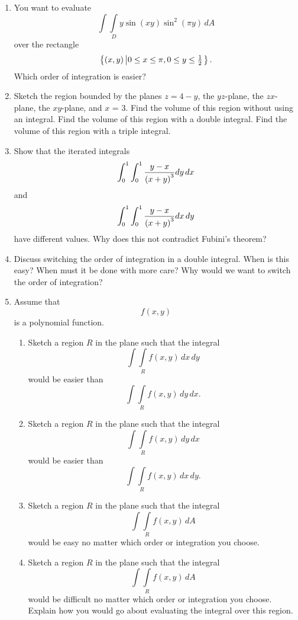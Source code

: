 \begin{enumerate}
\item  You want to evaluate $$ \int\!\!\!\int\limits_D {y\sin (xy)\sin ^2 (\pi y)} \,dA $$  over the rectangle $$ \left\{ {(x,y)\left| {0 \le x \le \pi ,0 \le y \le {\textstyle{1 \over 2}}} \right.} \right\} .$$  Which order of integration is easier?  

\item  Sketch the region bounded by the planes $z = 4 - y$, the $yz$-plane, the $zx$-plane, the $xy$-plane, and $x$ = 3.  Find the volume of this region without using an integral.  Find the volume of this region with a double integral.  Find the volume of this region with a triple integral.    

\item  Show that the iterated integrals $$ \int_0^1 {\int_0^1 {{{y - x} \over {\left( {x + y} \right)^3 }}dy\,dx} }  $$  and $$ \int_0^1 {\int_0^1 {{{y - x} \over {\left( {x + y} \right)^3 }}dx\,dy} }  $$  have different values.   Why does this not contradict Fubini's theorem?  \cite{SBS}  

\item  Discuss switching the order of integration in a double integral.  When is this easy?  When must it be done with more care?  Why would we want to switch the order of integration?  

\item  Assume that $$ f(x,y) $$  is a polynomial function.
\begin{enumerate} 

\item  Sketch a region $R$ in the plane such that the integral $$ \int\!\!\!\int\limits_R {f(x,y)\,dx\,dy}  $$  would be easier than $$ \int\!\!\!\int\limits_R {f(x,y)\,dy\,dx}  .$$


\item  Sketch a region $R$ in the plane such that the integral $$ \int\!\!\!\int\limits_R {f(x,y)\,dy\,dx}  $$  would be easier than $$ \int\!\!\!\int\limits_R {f(x,y)\,dx\,dy}  .$$  


\item  Sketch a region $R$ in the plane such that the integral $$ \int\!\!\!\int\limits_R {f(x,y)\,dA}  $$  would be easy no matter which order or integration you choose.  


\item  Sketch a region $R$ in the plane such that the integral $$ \int\!\!\!\int\limits_R {f(x,y)\,dA}  $$  would be difficult no matter which order or integration you choose.  Explain how you would go about evaluating the integral over this region. 


\end{enumerate}
\end{enumerate}
